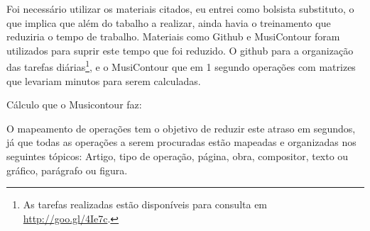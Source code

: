 \documentclass[11pt]{article}
\begin{document}
\label{sec:discussao}




Foi necessário utilizar os materiais citados, eu entrei como bolsista
substituto, o que implica que além do tabalho a realizar, ainda havia
o treinamento que reduziria o tempo de trabalho. Materiais como Github
e MusiContour foram utilizados para suprir este tempo que foi
reduzido. O github para a organização das tarefas diárias\footnote{As
  tarefas realizadas estão disponíveis para consulta em
  \url{http://goo.gl/4Ie7c}.}, e o MusiContour que em 1 segundo
operações com matrizes que levariam minutos para serem calculadas.


Cálculo que o Musicontour faz:


O mapeamento de operações tem o objetivo de reduzir este atraso em
segundos, já que todas as operações a serem procuradas estão mapeadas
e organizadas nos seguintes tópicos: Artigo, tipo de operação, página,
obra, compositor, texto ou gráfico, parágrafo ou figura.
\end{document}
